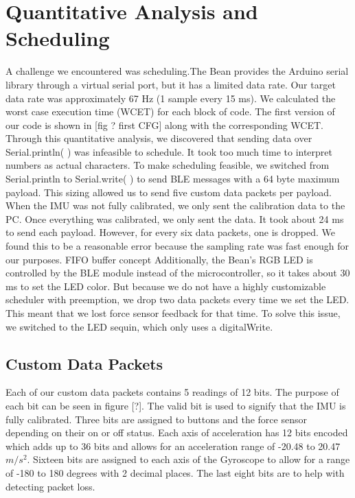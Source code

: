 \documentclass[12pt,journal]{IEEEtran}
\begin{document}
\section{Quantitative Analysis and Scheduling}
	A challenge we encountered was scheduling.The Bean provides the Arduino serial library through a virtual serial port, but it has a limited data rate. Our target data rate was approximately 67 Hz (1 sample every 15 ms). We calculated the worst case execution time (WCET) for each block of code. The first version of our code is shown in [fig ? first CFG] along with the corresponding WCET. Through this quantitative analysis, we discovered that sending data over Serial.println( ) was infeasible to schedule. It took too much time to interpret numbers as actual characters.
	 To make scheduling feasible, we switched from Serial.println to Serial.write( ) to send BLE messages with a 64 byte maximum payload. This sizing allowed us to send five custom data packets per payload. When the IMU was not fully calibrated, we only sent the calibration data to the PC. Once everything was calibrated, we only sent the data. It took about 24 ms to send each payload. However, for every six data packets, one is dropped. We found this to be a reasonable error because the sampling rate was fast enough for our purposes. FIFO buffer concept
	Additionally, the Bean’s RGB LED is controlled by the BLE module instead of the microcontroller, so it takes about 30 ms to set the LED color. But because we do not have a highly customizable scheduler with preemption, we drop two data packets every time we set the LED. This meant that we lost force sensor feedback for that time. To solve this issue, we switched to the LED sequin, which only uses a digitalWrite. 

\subsection{Custom Data Packets}
Each of our custom data packets contains 5 readings of 12 bits. The purpose of each bit can be seen in figure [?]. The valid bit is used to signify that the IMU is fully calibrated. Three bits are assigned to buttons and the force sensor depending on their on or off status. Each axis of acceleration has 12 bits encoded which adds up to 36 bits and allows for an acceleration range of -20.48 to 20.47 $m/s^2$. Sixteen bits are assigned to each axis of the Gyroscope to allow for a range of -180 to 180 degrees with 2 decimal places. The last eight bits are to help with detecting packet loss.
\end{document}
